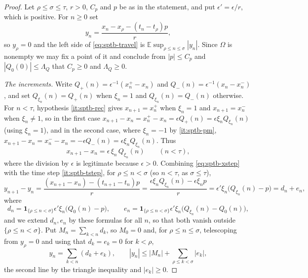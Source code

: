 \begin{proof}
Let $\rho\le\sigma\le\tau$, $r>0$, $C_p$ and $p$ be as in the statement, and put
$\epsilon'=\epsilon/r$, which is positive. For $n\ge0$ set
\[
  y_n=\frac{x_n-x_\rho-(t_n-t_\rho)p}{r},
\]
so $y_\rho=0$ and the left side of \eqref{eq:sptb-travel} is
$\mathbb E\sup_{\rho\le n\le\sigma}|y_n|$. Since $\Omega$ is nonempty we may fix
a point of it and conclude from $|p|\le C_p$ and $|Q_0(0)|\le\Lambda_Q$ that
$C_p\ge0$ and $\Lambda_Q\ge0$.

\emph{The increments.} Write $Q_{+}(n)=\epsilon^{-1}(x^+_n-x_n)$ and
$Q_{-}(n)=\epsilon^{-1}(x_n-x^-_n)$, and set $Q_{\xi_n}(n)=Q_+(n)$ when
$\xi_n=1$ and $Q_{\xi_n}(n)=Q_-(n)$ otherwise. For $n<\tau$, hypothesis
\ref{it:sptb-rec} gives $x_{n+1}=x^+_n$ when $\xi_n=1$ and $x_{n+1}=x^-_n$
when $\xi_n\ne1$, so in the first case
$x_{n+1}-x_n=x^+_n-x_n=\epsilon Q_+(n)=\epsilon\xi_nQ_{\xi_n}(n)$ (using
$\xi_n=1$), and in the second case, where $\xi_n=-1$ by \ref{it:sptb-pm},
$x_{n+1}-x_n=x^-_n-x_n=-\epsilon Q_-(n)=\epsilon\xi_nQ_{\xi_n}(n)$. Thus
\begin{equation}\label{eq:sptb-xstep}
  x_{n+1}-x_n=\epsilon\,\xi_n\,Q_{\xi_n}(n)\qquad(n<\tau),
\end{equation}
where the division by $\epsilon$ is legitimate because $\epsilon>0$. Combining
\eqref{eq:sptb-xstep} with the time step \ref{it:sptb-tstep}, for $\rho\le
n<\sigma$ (so $n<\tau$, as $\sigma\le\tau$),
\[
  y_{n+1}-y_n
   =\frac{(x_{n+1}-x_n)-(t_{n+1}-t_n)p}{r}
   =\frac{\epsilon\xi_nQ_{\xi_n}(n)-\epsilon\xi_np}{r}
   =\epsilon'\xi_n\bigl(Q_{\xi_n}(n)-p\bigr)=d_n+e_n ,
\]
where
\[
  d_n=\mathbf1_{\{\rho\le n<\sigma\}}\epsilon'\xi_n\bigl(Q_0(n)-p\bigr),\qquad
  e_n=\mathbf1_{\{\rho\le n<\sigma\}}\epsilon'\xi_n
        \bigl(Q_{\xi_n}(n)-Q_0(n)\bigr),
\]
and we extend $d_n,e_n$ by these formulas for all $n$, so that both vanish
outside $\{\rho\le n<\sigma\}$. Put $M_n=\sum_{k<n}d_k$, so $M_0=0$ and, for
$\rho\le n\le\sigma$, telescoping from $y_\rho=0$ and using that $d_k=e_k=0$ for
$k<\rho$,
\begin{equation}\label{eq:sptb-split}
  y_n=\sum_{k<n}(d_k+e_k),\qquad
  |y_n|\le|M_n|+\sum_{\rho\le k<\sigma}|e_k| ,
\end{equation}
the second line by the triangle inequality and $|e_k|\ge0$.


\end{proof}
